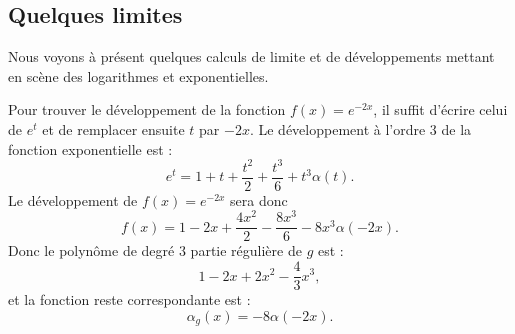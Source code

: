 \subsection{Quelques limites}

Nous voyons à présent quelques calculs de limite et de développements mettant en scène des logarithmes et exponentielles.

\begin{example}\label{compose1}
    Pour trouver le développement de la fonction \( f(x)= e^{-2x}\), il suffit d'écrire celui de \( e^t\) et de remplacer ensuite $t$ par \( -2x\). Le développement à l'ordre \( 3\) de la fonction exponentielle est :
    \begin{equation}
        e^t=1+t+\frac{ t^2 }{2}+\frac{ t^3 }{ 6 }+t^3\alpha(t).
    \end{equation}
    Le développement de \( f(x)= e^{-2x}\) sera donc
    \begin{equation}
        f(x)=1-2x+\frac{ 4x^2 }{ 2 }-\frac{ 8x^3 }{ 6 }-8x^3\alpha(-2x).
    \end{equation}
    Donc le polynôme de degré \( 3\) partie régulière de \( g\) est :
    \begin{equation}
        1-2x+2x^2-\frac{ 4 }{ 3 }x^3,
    \end{equation}
    et la fonction reste correspondante est :
    \begin{equation}
        \alpha_g(x)=-8\alpha(-2x).
    \end{equation}
\end{example}


